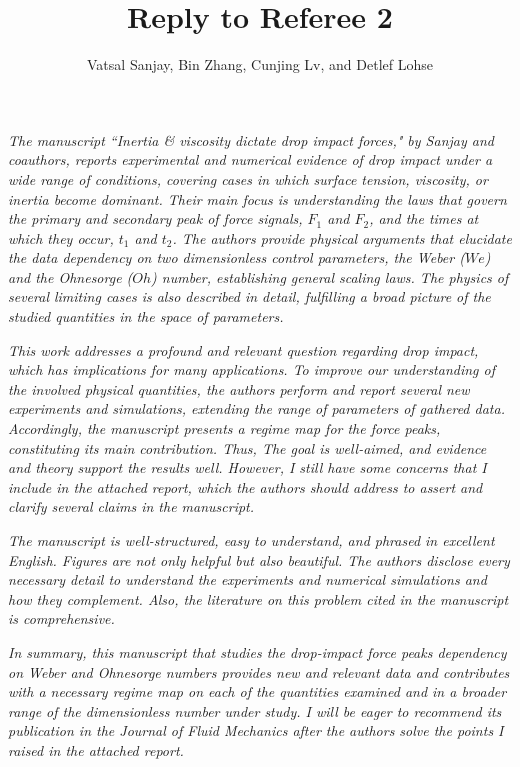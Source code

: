 \documentclass[]{article}
\title{Reply to Referee 2}
\author{Vatsal Sanjay, Bin Zhang, Cunjing Lv, and Detlef Lohse}
\date{}
\begin{document}
	
\maketitle
	
\textit{The manuscript ``Inertia \& viscosity dictate drop impact forces," by Sanjay and coauthors, reports experimental and numerical evidence of drop impact under a wide range of conditions, covering cases in which surface tension, viscosity, or inertia become dominant. Their main focus is understanding the laws that govern the primary and secondary peak of force signals, $F_1$ and $F_2$, and the times at which they occur, $t_1$ and $t_2$. The authors provide physical arguments that elucidate the data dependency on two dimensionless control parameters, the Weber ($We$) and the Ohnesorge ($Oh$) number, establishing general scaling laws. The physics of several limiting cases is also described in detail, fulfilling a broad picture of the studied quantities in the space of parameters.}
		
\textit{This work addresses a profound and relevant question regarding drop impact, which has implications for many applications. To improve our understanding of the involved physical quantities, the authors perform and report several new experiments and simulations, extending the range of parameters of gathered data. Accordingly, the manuscript presents a regime map for the force peaks, constituting its main contribution. Thus, The goal is well-aimed, and evidence and theory support the results well. However, I still have some concerns that I include in the attached report, which the authors should address to assert and clarify several claims in the manuscript.}
	
\textit{The manuscript is well-structured, easy to understand, and phrased in excellent English. Figures are not only helpful but also beautiful. The authors disclose every necessary detail to understand the experiments and numerical simulations and how they complement. Also, the literature on this problem cited in the manuscript is comprehensive.}
	
\textit{In summary, this manuscript that studies the drop-impact force peaks dependency on Weber and Ohnesorge numbers provides new and relevant data and contributes with a necessary regime map on each of the quantities examined and in a broader range of the dimensionless number under study. I will be eager to recommend its publication in the Journal of Fluid Mechanics after the authors solve the points I raised in the attached report.}\\[2mm]
\end{document}
